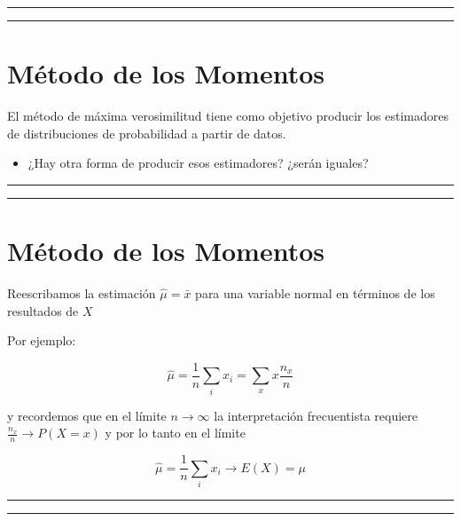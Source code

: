 \documentclass[
]{book}
\providecommand{\tightlist}{%
  \setlength{\itemsep}{0pt}\setlength{\parskip}{0pt}}
\begin{document}
\begin{center}\rule{0.5\linewidth}{0.5pt}\end{center}

\begin{center}\rule{0.5\linewidth}{0.5pt}\end{center}

\hypertarget{muxe9todo-de-los-momentos}{%
\section{Método de los Momentos}\label{muxe9todo-de-los-momentos}}

El método de máxima verosimilitud tiene como objetivo producir los estimadores de distribuciones de probabilidad a partir de datos.

\begin{itemize}
\tightlist
\item
  ¿Hay otra forma de producir esos estimadores? ¿serán iguales?
\end{itemize}

\begin{center}\rule{0.5\linewidth}{0.5pt}\end{center}

\begin{center}\rule{0.5\linewidth}{0.5pt}\end{center}

\hypertarget{muxe9todo-de-los-momentos-1}{%
\section{Método de los Momentos}\label{muxe9todo-de-los-momentos-1}}

Reescribamos la estimación \(\hat{\mu}=\bar{x}\) para una variable normal en términos de los resultados de \(X\)

Por ejemplo:

\[\hat{\mu}=\frac{1}{n}\sum_i x_i= \sum_x x \frac{n_x}{n}\]

y recordemos que en el límite \(n \rightarrow \infty\) la interpretación frecuentista requiere \(\frac{n_x}{n} \rightarrow P(X=x)\) y por lo tanto en el límite

\[\hat{\mu}=\frac{1}{n}\sum_i x_i \rightarrow E(X)=\mu\]

\begin{center}\rule{0.5\linewidth}{0.5pt}\end{center}

\begin{center}\rule{0.5\linewidth}{0.5pt}\end{center}
\end{document}
